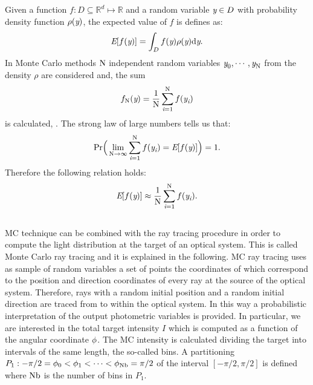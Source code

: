 Given a function $f:D\subseteq \mathbb{R}^d \mapsto \mathbb{R}$ and a random variable $\textit{y}\in D$ with probability density function $\rho(\textit{y})$, the expected value of $f$ is defines as:
\begin{equation}
\textit{E}[f(\textit{y})] =\int_{D}f(\textit{y})\rho(\textit{y}) \textrm{d}\textit{y}.
\end{equation}
In Monte Carlo methods $\textrm{N}$ independent random variables  $\textit{y}_0, \cdots, \textit{y}_{\textrm{N}}$  from the density $\rho$ are considered and, the sum 
\begin{equation}
f_{\textrm{N}}(\textit{y}) = \frac{1}{\textrm{N}} \sum_{\textit{i}=1}^{\textrm{N}} f(\textit{y}_{\textit{i}})
\end{equation}
is calculated,  \cite{owen2003quasi}. 
The strong law of large numbers tells us that:
\begin{equation}
\textrm{Pr}\Big(\lim_{\textrm{N}\rightarrow\infty}\sum_{\textit{i}=1}^{\textrm{N}} f(\textit{y}_{\textit{i}}) = \textit{E}[f(\textit{y})] \Big) = 1.
\end{equation}
Therefore the following relation holds:
\begin{equation}
\textit{E}[f(\textit{y})] \approx \frac{1}{\textrm{N}} \sum_{\textit{i}=1}^{\textrm{N}} f(\textit{y}_{\textit{i}}).
\end{equation}
\\ \indent MC technique can be combined with the ray tracing procedure in order to compute the light distribution at the target of an optical system. 
This is called Monte Carlo ray tracing and it is explained in the following. 
MC ray tracing uses as sample of random variables a set of points the coordinates of which correspond to the position and direction coordinates of every ray at the source of the optical system.
Therefore, rays with a random initial position and a random initial direction are traced from  to  within the optical system.
In this way a probabilistic interpretation of the output photometric variables is provided. 
In particular, we are interested in the total target intensity $I$ which is computed as a function of the angular coordinate $\phi$.
The MC intensity is calculated dividing the target into intervals of the same length, the so-called bins. A partitioning 
$P_1: -\pi/2 = \phi_{0}<\phi_{1}<\cdots <\phi_{\textrm{Nb}}=\pi/2$ of the interval $[-\pi/2, \pi/2]$ is defined where $\textrm{Nb}$ is the number of bins in $P_1$.
